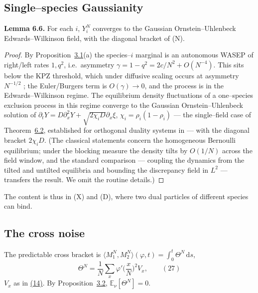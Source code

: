 \documentclass[11pt]{article}
\theoremstyle{plain}
\theoremstyle{definition}
\theoremstyle{remark}
\newcommand{\E}{\mathbb{E}}\newcommand{\PP}{\mathbb{P}}\newcommand{\dd}{\,\mathrm{d}}
\begin{document}
\subsection{Single--species Gaussianity}
\label{lem_gauss}\noindent\textbf{Lemma 6.6.} 
For each $i$, $Y_i^N$ converges to the Gaussian Ornstein--Uhlenbeck
Edwards--Wilkinson field, with the diagonal bracket of \textup{(N)}.
\par
\begin{proof}
By Proposition~\hyperref[prop_decouple]{3.1}(a) the species--$i$ marginal is an autonomous WASEP
of right/left rates $1,q^2$, i.e.\ asymmetry $\gamma=1-q^2=2c/N^2+O(N^{-4})$. This sits
below the KPZ threshold, which under diffusive scaling occurs at asymmetry $N^{-1/2}$
\cite{GJ}; the Euler/Burgers term is $O(\gamma)\to0$, and the process is in the
Edwards--Wilkinson regime. The equilibrium density fluctuations of a one--species
exclusion process in this regime converge to the Gaussian Ornstein--Uhlenbeck solution
of $\partial_tY=D\partial_x^2Y+\sqrt{2\chi_i D}\partial_x\xi$, $\chi_i=\rho_i(1-\rho_i)$
--- the single--field case of Theorem~\hyperref[thm_mp]{6.2}, established for orthogonal duality
systems in \cite{ACR2} --- with the diagonal bracket $2\chi_i D$. (The classical statements concern the homogeneous Bernoulli equilibrium;
under the blocking measure the density tilts by $O(1/N)$ across the field window, and
the standard comparison --- coupling the dynamics from the tilted and untilted
equilibria and bounding the discrepancy field in $L^2$ --- transfers the result. We
omit the routine details.)
\end{proof}

\noindent The content is thus in (X) and (D), where two dual particles of different
species can bind.

\subsection{The cross noise}
The predictable cross bracket is $\langle M_1^N,M_2^N\rangle(\varphi,t)=\int_0^t\Theta^N\dd s$,
\label{eq_Theta}
\begin{equation}
  \Theta^N=\frac1N\sum_x\varphi'\Big(\frac xN\Big)^2 V_x,\qquad(27)
\end{equation}
$V_x$ as in \hyperref[eq_Vdef]{(14)}. By Proposition~\hyperref[prop_cross]{3.2}, $\E_\nu[\Theta^N]=0$.
\end{document}
